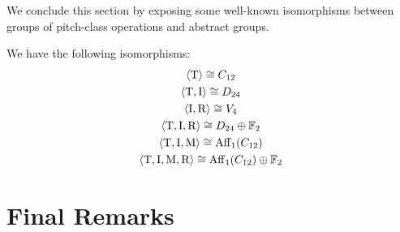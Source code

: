 We conclude this section by exposing some well-known isomorphisms between groups of pitch-class operations and abstract groups.

\begin{proposition}
	\cite[127]{FripertingerLackner2015}
	We have the following isomorphisms:
	\begin{gather}
		\langle \operatorname{T} \rangle \cong C_{12} \\
		\langle \operatorname{T}, \operatorname{I} \rangle \cong D_{24} \\
		\langle \operatorname{I}, \operatorname{R} \rangle \cong V_4 \\
		\langle \operatorname{T}, \operatorname{I}, \operatorname{R} \rangle \cong D_{24} \oplus \mathbb{F}_2 \\
		\langle \operatorname{T}, \operatorname{I}, \operatorname{M} \rangle \cong \operatorname{Aff}_1(C_{12}) \\
		\langle \operatorname{T}, \operatorname{I}, \operatorname{M}, \operatorname{R} \rangle \cong \operatorname{Aff}_1(C_{12}) \oplus \mathbb{F}_2
	\end{gather}
\end{proposition}

\section{Final Remarks}

